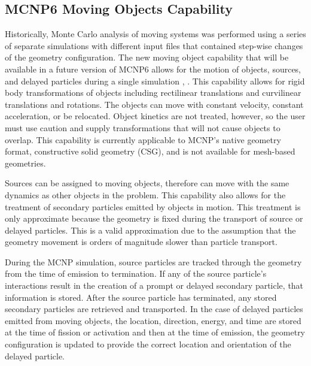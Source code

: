 \subsection{MCNP6 Moving Objects Capability} \label{sec:mcnp_move}
Historically, Monte Carlo analysis of moving systems was performed using a 
series of separate simulations with different input files that contained 
step-wise changes of the geometry configuration. 
The new moving object capability that will be available in a future version
of MCNP6 allows for the
motion of objects, sources, and delayed particles during a single simulation
\cite{mcnp_moving_1}, \cite{mcnp_moving_2}.
This capability allows for rigid body transformations of 
objects including rectilinear translations and curvilinear translations and rotations.
The objects can move with constant velocity, constant acceleration, or be
relocated.
Object kinetics are not treated, however, so the user must use caution and supply
transformations that will not cause objects to overlap.
This capability is currently applicable to MCNP's native geometry format,
constructive solid geometry (CSG), and is not available for mesh-based
geometries.

Sources can be assigned to moving objects, therefore can move with the
same dynamics as other objects in the problem.
This capability also allows for the treatment of secondary particles emitted by
objects in motion. This treatment is only approximate because the geometry is fixed during the
transport of source or delayed particles. This is a valid approximation due to
the assumption that the geometry movement is orders of magnitude slower than
particle transport.

During the MCNP simulation, source particles are tracked through the geometry
from the time of emission to termination.  If any of the source particle's
interactions result in the creation of a prompt or delayed secondary particle,
that information is stored.  After the source particle has terminated, any
stored secondary particles are retrieved and transported.
In the case of delayed particles emitted from moving objects, the location, direction, energy, and
time are stored at the time of fission or activation and then at the time of
emission, the geometry configuration is updated to provide the correct 
location and orientation of the delayed particle. 


